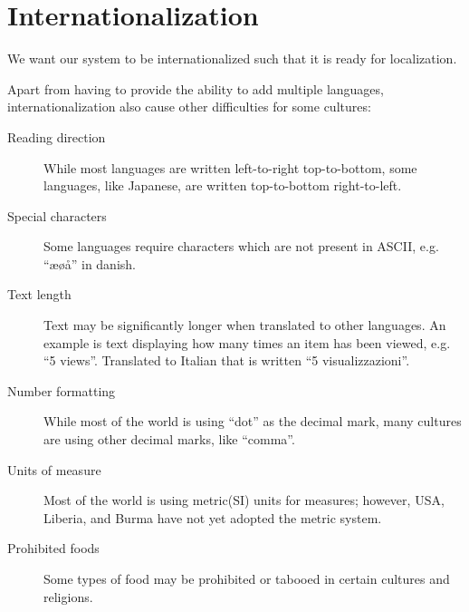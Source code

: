\section{Internationalization}
We want our system to be internationalized such that it is ready for localization.

Apart from having to provide the ability to add multiple languages, internationalization also cause other difficulties for some cultures:

\begin{description}
  \item[Reading direction] While most languages are written left-to-right top-to-bottom, some languages, like Japanese, are written top-to-bottom right-to-left.
  \item[Special characters] Some languages require characters which are not present in ASCII, e.g. ``æøå'' in danish.
  \item[Text length] Text may be significantly longer when translated to other languages. An example is text displaying how many times an item has been viewed, e.g. ``5 views''. Translated to Italian that is written ``5 visualizzazioni''.\cite{wordlength}
  \item[Number formatting] While most of the world is using ``dot'' as the decimal mark, many cultures are using other decimal marks, like ``comma''.
  \item[Units of measure] Most of the world is using metric(SI) units for measures; however, USA, Liberia, and Burma have not yet adopted the metric system.\cite{unitsfactbook}
  \item[Prohibited foods] Some types of food may be prohibited or tabooed in certain cultures and religions.
\end{description}
